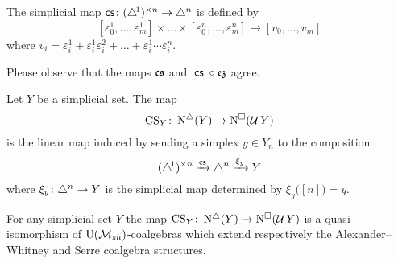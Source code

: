 \begin{definition}
	The simplicial map $\operatorname{\mathsf{cs}} \colon (\triangle^{\!1})^{\times n} \to \triangle^n$ is defined by
	\[
	[\varepsilon_0^1, \dots, \varepsilon_m^1]
	\times \dots \times
	[\varepsilon_0^n, \dots, \varepsilon_m^n]
	\mapsto
	[v_0, \dots, v_m]
	\]
	where $v_i = \varepsilon_i^1 + \varepsilon_i^1 \varepsilon_i^2 + \dots + \varepsilon_i^1 \dotsm \varepsilon_i^n$.
\end{definition}

Please observe that the maps $\operatorname{\mathfrak{cs}}$ and $\lvert\operatorname{\mathsf{cs}}\rvert \circ \operatorname{\mathfrak{ez}}$ agree.

\begin{definition}
	Let $Y$ be a simplicial set.
	The map
	\[
	\operatorname{CS}_Y \colon \operatorname{N^{\triangle}}(Y) \to \operatorname{N^{\square}}(\operatorname{\mathcal{U}} Y)
	\]
	is the linear map induced by sending a simplex $y \in Y_n$ to the composition
	\[
	(\triangle^{\!1})^{\times n} \xrightarrow{\operatorname{\mathsf{cs}}} \triangle^n \xrightarrow{\xi_y} Y
	\]
	where $\xi_y \colon \triangle^n \to Y$ is the simplicial map determined by $\xi_y \big( [n] \big) = y$.
\end{definition}

\begin{theorem} \label{t:main comparison}
	For any simplicial set $Y$ the map $\operatorname{CS}_Y \colon \operatorname{N^{\triangle}}(Y) \to \operatorname{N^{\square}}(\operatorname{\mathcal{U}} Y)$ is a quasi-isomorphism of ${\operatorname{U}(\mathcal{M}_{sh})}$-coalgebras which extend respectively the Alexander--Whitney and Serre coalgebra structures.
\end{theorem}

